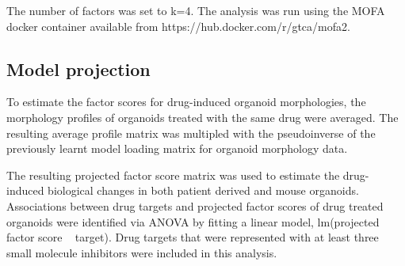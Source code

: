 \begin{flushleft}
The number of factors was set to k=4. The analysis was run using the MOFA docker container available from https://hub.docker.com/r/gtca/mofa2.


\subsection{Model projection}
To estimate the factor scores for drug-induced organoid morphologies, the morphology profiles of organoids treated with the same drug were averaged. The resulting average profile matrix was multipled with the pseudoinverse of the previously learnt model loading matrix for organoid morphology data. 

\smallbreak
The resulting projected factor score matrix was used to estimate the drug-induced biological changes in both patient derived and mouse organoids. Associations between drug targets and projected factor scores of drug treated organoids were identified via ANOVA by fitting a linear model, lm(projected factor score ~ target). Drug targets that were represented with at least three small molecule inhibitors were included in this analysis.

\end{flushleft}